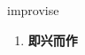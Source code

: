 
\begin{frame}
{\huge improvise}
\begin{center}
\begin{enumerate}\Large
  \item \textbf{即兴而作}
\end{enumerate}
\end{center}
\end{frame}
